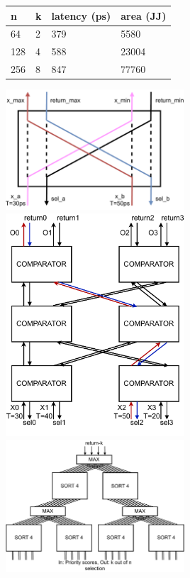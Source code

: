 \documentclass{article}
\begin{document}

\begin{table}[]
\begin{tabular}{|l|l|l|l|}
\hline
n   & k & latency (ps) & area (JJ) \\ \hline
64  & 2 & 379          & 5580      \\ \hline
128 & 4 & 588          & 23004     \\ \hline
256 & 8 & 847          & 77760     \\ \hline
\end{tabular}
\end{table}

\includegraphics*[width=0.5\textwidth]{diagrams/comparator.drawio.pdf}
\includegraphics*[width=0.5\textwidth]{diagrams/sort4.drawio.pdf}
\includegraphics*[width=0.5\textwidth]{diagrams/arbiterk4n16.drawio.pdf}
\end{document}
